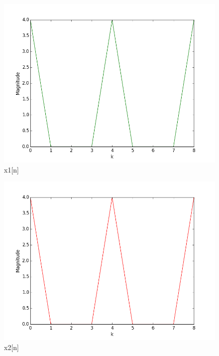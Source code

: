 \begin{figure}[H]
  \centering
  \includegraphics[width=\linewidth]{2b_1}
  \caption{x1[n]}
  \label{fig:2b1}
\end{figure}
\begin{figure}[H]
  \centering
  \includegraphics[width=\linewidth]{2b_2}
  \caption{x2[n]}
  \label{fig:2b2}
\end{figure}
